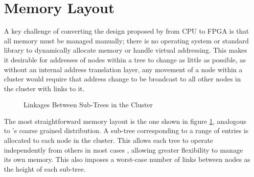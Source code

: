 \section{Memory Layout}

A key challenge of converting the design proposed by \citeauthor{base} from CPU to FPGA is that all memory must be managed manually; there is no operating system or standard library to dynamically allocate memory or handle virtual addressing. This makes it desirable for addresses of nodes within a tree to change as little as possible, as without an internal address translation layer, any movement of a node within a cluster would require that address change to be broadcast to all other nodes in the cluster with links to it.

\newcommand{\clusternode}[1]{
	\draw ({(#1)*6}, 0) ++(-2.75, 0.5) rectangle ++(5.5, -3);
	\node[tree] at ({(#1)*6}, 0) (n#1 00) {};
	\foreach \r [
		evaluate = \r as \w using int(3^\r),
		evaluate = \r as \wl using int(3^\r-1)
	] in {1,...,2} {
		\foreach \c [
			evaluate = \c as \i using int((\w-1)/2 + \c-1),
			evaluate = \c as \pr using int(\r-1),
			evaluate = \c as \pc using int(\c/3),
			evaluate = \c as \cl using int(\c-1)
		] in {0,...,\wl} {
			\node[tree] (n#1 \r\c)
				at ({(#1)*6 + (\c-int(\w/2)) / (\w/5)}, -\r) {};
			\draw[->] (n#1 \pr\pc) -- (n#1 \r\c);
			\ifthenelse{\c=0}{}{
				\draw[->] (n#1 \r\cl) -- (n#1 \r\c);
			}
		}
	}
}

\begin{figure}
	\centering
	\caption{Linkages Between Sub-Trees in the Cluster}
\label{coarse-link}
\end{figure}

The most straightforward memory layout is the one shown in figure \ref{coarse-link}, analogous to \citeauthor{base}'s coarse grained distribution. A sub-tree corresponding to a range of entries is allocated to each node in the cluster. This allows each tree to operate independently from others in most cases \autocite{ma-tpds-2022}, allowing greater flexibility to manage its own memory. This also imposes a worst-case number of links between nodes as the height of each sub-tree.
